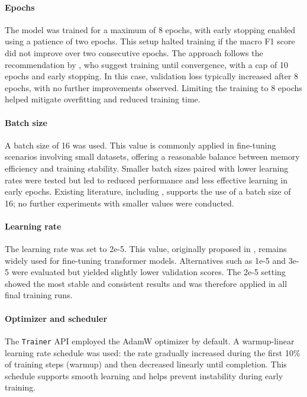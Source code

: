     \paragraph{Epochs} The model was trained for a maximum of 8 epochs, with early stopping enabled using a patience of two epochs. This setup halted training if the macro F1 score did not improve over two consecutive epochs. The approach follows the recommendation by \textcite{pecherComparingSpecialisedSmall2024}, who suggest training until convergence, with a cap of 10 epochs and early stopping. In this case, validation loss typically increased after 8 epochs, with no further improvements observed. Limiting the training to 8 epochs helped mitigate overfitting and reduced training time.

    \paragraph{Batch size} A batch size of 16 was used. This value is commonly applied in fine-tuning scenarios involving small datasets, offering a reasonable balance between memory efficiency and training stability. Smaller batch sizes paired with lower learning rates were tested but led to reduced performance and less effective learning in early epochs. Existing literature, including \textcite{mosbachStabilityFinetuningBERT2021}, supports the use of a batch size of 16; no further experiments with smaller values were conducted.

    \paragraph{Learning rate} The learning rate was set to 2e-5. This value, originally proposed in \textcite{devlinBERTPretrainingDeep2019}, remains widely used for fine-tuning transformer models. Alternatives such as 1e-5 and 3e-5 were evaluated but yielded slightly lower validation scores. The 2e-5 setting showed the most stable and consistent results and was therefore applied in all final training runs.

    \paragraph{Optimizer and scheduler} The \texttt{Trainer} API employed the AdamW optimizer by default. A warmup-linear learning rate schedule was used: the rate gradually increased during the first 10\% of training steps (warmup) and then decreased linearly until completion. This schedule supports smooth learning and helps prevent instability during early training.


